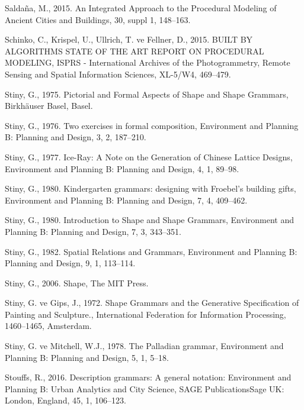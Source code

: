 \documentclass[12pt,turkish,a4paperpaper,]{report}
\begin{document}
\leavevmode\hypertarget{ref-Saldana:2015el}{}%
Saldaña, M., 2015. An Integrated Approach to the Procedural Modeling of
Ancient Cities and Buildings, 30, suppl 1, 148--163.

\leavevmode\hypertarget{ref-Schinko:2015gn}{}%
Schinko, C., Krispel, U., Ullrich, T. ve Fellner, D., 2015. BUILT BY
ALGORITHMS STATE OF THE ART REPORT ON PROCEDURAL MODELING, ISPRS -
International Archives of the Photogrammetry, Remote Sensing and Spatial
Information Sciences, XL-5/W4, 469--479.

\leavevmode\hypertarget{ref-Stiny:1975fj}{}%
Stiny, G., 1975. Pictorial and Formal Aspects of Shape and Shape
Grammars, Birkhäuser Basel, Basel.

\leavevmode\hypertarget{ref-Stiny:1976im}{}%
Stiny, G., 1976. Two exercises in formal composition, Environment and
Planning B: Planning and Design, 3, 2, 187--210.

\leavevmode\hypertarget{ref-Stiny:1977im}{}%
Stiny, G., 1977. Ice-Ray: A Note on the Generation of Chinese Lattice
Designs, Environment and Planning B: Planning and Design, 4, 1, 89--98.

\leavevmode\hypertarget{ref-Stiny:1980kq}{}%
Stiny, G., 1980. Kindergarten grammars: designing with Froebel's
building gifts, Environment and Planning B: Planning and Design, 7, 4,
409--462.

\leavevmode\hypertarget{ref-Stiny:1980it}{}%
Stiny, G., 1980. Introduction to Shape and Shape Grammars, Environment
and Planning B: Planning and Design, 7, 3, 343--351.

\leavevmode\hypertarget{ref-Stiny:1982cn}{}%
Stiny, G., 1982. Spatial Relations and Grammars, Environment and
Planning B: Planning and Design, 9, 1, 113--114.

\leavevmode\hypertarget{ref-Stiny:2006tq}{}%
Stiny, G., 2006. Shape, The MIT Press.

\leavevmode\hypertarget{ref-Stiny:1972tt}{}%
Stiny, G. ve Gips, J., 1972. Shape Grammars and the Generative
Specification of Painting and Sculpture., International Federation for
Information Processing, 1460--1465, Amsterdam.

\leavevmode\hypertarget{ref-Stiny:1978cl}{}%
Stiny, G. ve Mitchell, W.J., 1978. The Palladian grammar, Environment
and Planning B: Planning and Design, 5, 1, 5--18.

\leavevmode\hypertarget{ref-Stouffs:2016ip}{}%
Stouffs, R., 2016. Description grammars: A general notation: Environment
and Planning B: Urban Analytics and City Science, SAGE PublicationsSage
UK: London, England, 45, 1, 106--123.
\end{document}
